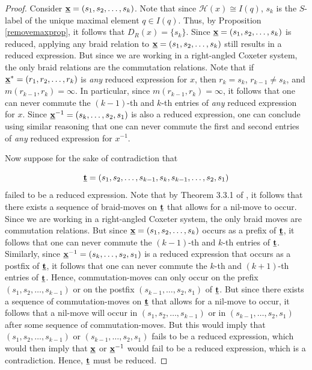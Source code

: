 \documentclass{amsart}
\theoremstyle{plain} %
\theoremstyle{definition}
\def\H#1{\mathcal{H}(#1)}
\begin{document}
\begin{proof}

    Consider $ \textbf{\underline{x}} = (s_{1},s_{2}, \dots , s_{k})$. Note that since $ \H{x} \cong I(q)$, $ s_{k}$ is the $S$-label of the unique maximal element $ q\in I(q)$. Thus, by Proposition \ref{removemaxprop}, it follows that $ D_{R}(x) = \{  s_{k} \}$. Since $ \textbf{\underline{x}} = (s_{1},s_{2}, \dots , s_{k})$ is reduced, applying any braid relation to $ \textbf{\underline{x}} = (s_{1},s_{2}, \dots , s_{k})$ still results in a reduced expression. But since we are working in a right-angled Coxeter system, the only braid relations are the commutation relations. Note that if $ \textbf{\underline{x}}^{\ast} = (r_{1}, r_{2} , \dots , r_{k})$ is \emph{any} reduced expression for $ x$, then $ r_{k} = s_{k}$, $ r_{k-1} \neq s_{k}$, and $ m(r_{k-1}, r_{k}) = \infty$. In particular, since $  m(r_{k-1}, r_{k}) = \infty$, it follows that one can never commute the $(k-1)$-th and $ k$-th entries of \emph{any} reduced expression for $ x$. Since $ \textbf{\underline{x}}^{-1} = (s_{k}, \dots , s_{2}, s_{1})$ is also a reduced expression, one can conclude using similar reasoning that one can never commute the first and second entries of \emph{any} reduced expression for $ x^{-1}$.



    Now suppose for the sake of contradiction that 

    $$ \textbf{\underline{t}} = (s_{1},s_{2}, \dots, s_{k-1},s_{k},s_{k-1}, \dots ,s_{2},s_{1})$$
    failed to be a reduced expression. Note that by Theorem 3.3.1 of \cite{bjorner2005combinatorics}, it follows that there exists a sequence of braid-moves on $\textbf{\underline{t}}$ that allows for a nil-move to occur. Since we are working in a right-angled Coxeter system, the only braid moves are commutation relations. But since $ \textbf{\underline{x}} = (s_{1},s_{2}, \dots , s_{k})$ occurs as a prefix of $ \textbf{\underline{t}}$, it follows that one can never commute the $ (k-1)$-th and $ k$-th entries of $ \textbf{\underline{t}}$. Similarly, since $ \textbf{\underline{x}}^{-1} = (s_{k}, \dots , s_{2}, s_{1})$ is a reduced expression that occurs as a postfix of $ \textbf{\underline{t}}$, it follows that one can never commute the $ k$-th and $(k+1)$-th entries of $ \textbf{\underline{t}}$. Hence, commutation-moves can only occur on the prefix $ (s_{1}, s_{2}, \dots , s_{k-1})$ or on the postfix $(s_{k-1}, \dots , s_{2}, s_{1})$ of $ \textbf{\underline{t}}$. But since there exists a sequence of commutation-moves on $\textbf{\underline{t}}$ that allows for a nil-move to occur, it follows that a nil-move will occur in $(s_{1}, s_{2}, \dots , s_{k-1}) $ or in $ (s_{k-1}, \dots , s_{2}, s_{1})$ after some sequence of commutation-moves. But this would imply that $(s_{1}, s_{2}, \dots , s_{k-1}) $ or $ (s_{k-1}, \dots , s_{2}, s_{1})$ fails to be a reduced expression, which would then imply that $ \textbf{\underline{x}}$ or $ \textbf{\underline{x}}^{-1}$ would fail to be a reduced expression, which is a contradiction. Hence, $ \textbf{\underline{t}}$ must be reduced.
\end{proof}
\end{document}
